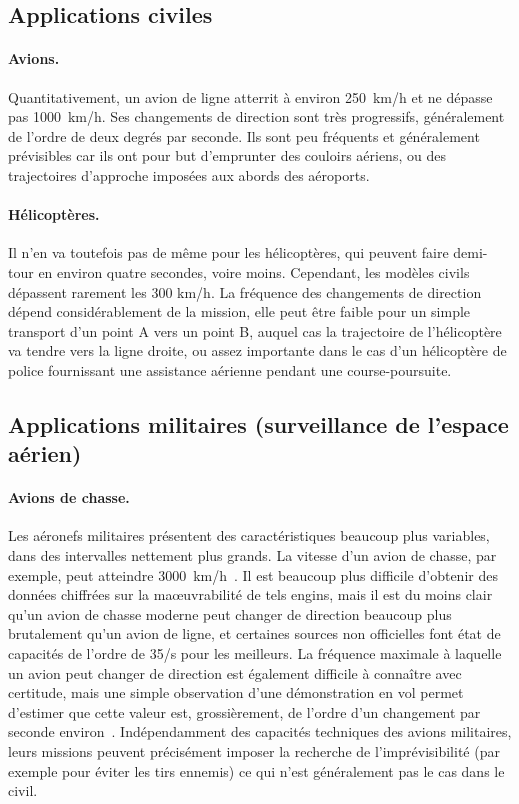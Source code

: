 	\subsection{Applications civiles}
	\paragraph{Avions.}
	Quantitativement, un avion de ligne atterrit à environ 250~km/h et ne dépasse pas 1000~km/h. Ses changements de direction sont très progressifs, généralement de l'ordre de deux degrés par seconde. Ils sont peu fréquents et généralement prévisibles car ils ont pour but d'emprunter des couloirs aériens, ou des trajectoires d'approche imposées aux abords des aéroports.

	\paragraph{Hélicoptères.}
	Il n'en va toutefois pas de même pour les hélicoptères, qui peuvent faire demi-tour en environ quatre secondes, voire moins. Cependant, les modèles civils dépassent rarement les 300 km/h. La fréquence des changements de direction dépend considérablement de la mission, elle peut être faible pour un simple transport d'un point A vers un point B, auquel cas la trajectoire de l'hélicoptère va tendre vers la ligne droite, ou assez importante dans le cas d'un hélicoptère de police fournissant une assistance aérienne pendant une course-poursuite.
	
	\subsection{Applications militaires (surveillance de l'espace aérien)}
	\paragraph{Avions de chasse.}
	Les aéronefs militaires présentent des caractéristiques beaucoup plus variables, dans des intervalles nettement plus grands. La vitesse d'un avion de chasse, par exemple, peut atteindre 3000~km/h~\cite{mig31}. Il est beaucoup plus difficile d'obtenir des données chiffrées sur la maœuvrabilité de tels engins, mais il est du moins clair qu'un avion de chasse moderne peut changer de direction beaucoup plus brutalement qu'un avion de ligne, et certaines sources non officielles font état de capacités de l'ordre de 35\textdegree{}/s pour les meilleurs. La fréquence maximale à laquelle un avion peut changer de direction est également difficile à connaître avec certitude, mais une simple observation d'une démonstration en vol permet d'estimer que cette valeur est, grossièrement, de l'ordre d'un changement par seconde environ~\cite{rafdemo}. Indépendamment des capacités techniques des avions militaires, leurs missions peuvent précisément imposer la recherche de l'imprévisibilité (par exemple pour éviter les tirs ennemis) ce qui n'est généralement pas le cas dans le civil.
	
